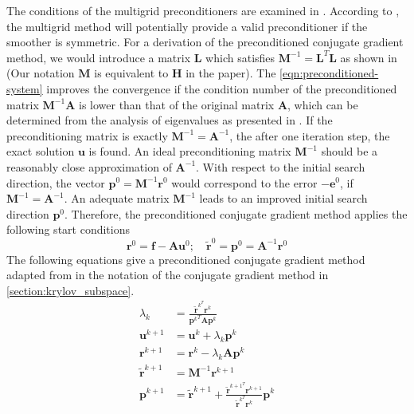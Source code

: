  The conditions of the multigrid preconditioners are examined in \cite{tatebe1993multigrid}. According to \cite{wesseling2004introduction}, the multigrid method will potentially provide a valid preconditioner if the smoother is symmetric. For a derivation of the preconditioned conjugate gradient method, we would introduce a matrix $\boldsymbol{L}$ which satisfies $\boldsymbol{M}^{-1} = \boldsymbol{L}^T\boldsymbol{L}$ as shown in \cite{wesseling2004introduction} (Our notation $\boldsymbol{M}$ is equivalent to $\boldsymbol{H}$ in the paper). The \autoref{eqn:preconditioned-system}  improves the convergence if the condition number of the preconditioned matrix $\boldsymbol{M}^{-1}\boldsymbol{A}$ is lower than that of the original matrix $\boldsymbol{A}$, which can be determined from the analysis of eigenvalues as presented in \cite{hackbusch2013iterative}. If the preconditioning matrix is exactly $\boldsymbol{M}^{-1} = \boldsymbol{A}^{-1}$, the after one iteration step, the exact solution $\boldsymbol{u}$ is found. An ideal preconditioning matrix $\boldsymbol{M}^{-1}$ should be a reasonably close approximation of $\boldsymbol{A}^{-1}$. With respect to the initial search direction, the vector $\boldsymbol{p}^0 = \boldsymbol{M}^{-1}\boldsymbol{r}^0$ would correspond to the error $-\boldsymbol{e}^0$, if $\boldsymbol{M}^{-1} = \boldsymbol{A}^{-1}$. An adequate matrix $\boldsymbol{M}^{-1}$ leads to an improved initial search direction $\boldsymbol{p}^0$. Therefore, the preconditioned conjugate gradient method applies the following start conditions
\begin{equation}
    \boldsymbol{r}^0 = \boldsymbol{f} - \boldsymbol{A}\boldsymbol{u}^0; \quad \tilde{\boldsymbol{r}}^0 = \boldsymbol{p}^0 = \boldsymbol{A}^{-1}\boldsymbol{r}^0
\end{equation}
The following equations give a preconditioned conjugate gradient method adapted from \cite{tatebe1993multigrid} in the notation of the conjugate gradient method in \autoref{section:krylov_subspace}.
\begin{align}
    \lambda_k &= \frac{\tilde{\boldsymbol{r}}^{k^T}\boldsymbol{r}^k}{{\boldsymbol{p}^k}^T\boldsymbol{A}\boldsymbol{p}^k} \\
    \boldsymbol{u}^{k+1} &= \boldsymbol{u}^k + \lambda_k\boldsymbol{p}^k \\
    \boldsymbol{r}^{k+1} &= \boldsymbol{r}^k - \lambda_k\boldsymbol{A}\boldsymbol{p}^k \\
    \tilde{\boldsymbol{r}}^{k+1} &= \boldsymbol{M}^{-1} \boldsymbol{r}^{k+1} \label{step:pcg}\\
    \boldsymbol{p}^{k+1} &= \tilde{\boldsymbol{r}}^{k+1} + \frac{\tilde{\boldsymbol{r}}^{{k+1}^T}\boldsymbol{r}^{k+1}}{\tilde{\boldsymbol{r}}^{k^T}\boldsymbol{r}^k} \boldsymbol{p}^k %
\end{align}

